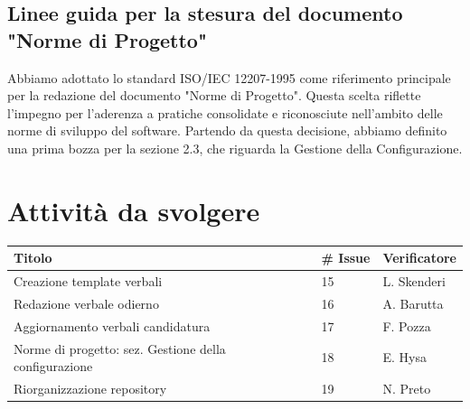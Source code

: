 \documentclass{article}
\begin{document}
    \subsection{Linee guida per la stesura del documento "Norme di Progetto"}
        Abbiamo adottato lo standard ISO/IEC 12207-1995 come riferimento principale per la redazione del documento "Norme di Progetto". Questa scelta riflette l'impegno per l'aderenza a pratiche consolidate e riconosciute nell'ambito delle norme di sviluppo del software.
        Partendo da questa decisione, abbiamo definito una prima bozza per la sezione 2.3, che riguarda la Gestione della Configurazione.

\section{Attività da svolgere}
    \begin{center}
        \begin{tabular}{|C{7cm}|C{1,5cm}|C{3cm}|}
            \hline
            \textbf{Titolo} & \textbf{\# Issue} & \textbf{Verificatore} \\
            \hline\hline
            Creazione template verbali & 15 & L. Skenderi \\
            Redazione verbale odierno & 16 & A. Barutta \\
            Aggiornamento verbali candidatura & 17 & F. Pozza \\
            Norme di progetto: sez. Gestione della configurazione & 18 & E. Hysa \\
            Riorganizzazione repository & 19 & N. Preto \\
            \hline
        \end{tabular}
    \end{center}
\end{document}
